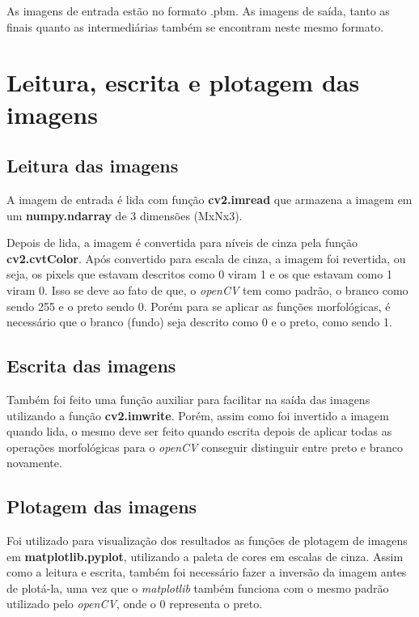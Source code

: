\documentclass{article}
\begin{document}
As imagens de entrada estão no formato .pbm. As imagens de saída, tanto as finais quanto as intermediárias também se encontram neste mesmo formato.

\section{Leitura, escrita e plotagem das imagens}

\subsection{Leitura das imagens}

A imagem de entrada é lida com função \textbf{cv2.imread} que armazena a imagem em um \textbf{numpy.ndarray} de 3 dimensões (MxNx3).

Depois de lida, a imagem é convertida para níveis de cinza pela função \textbf{cv2.cvtColor}. Após convertido para escala de cinza, a imagem foi revertida, ou seja, os pixels que estavam descritos como 0 viram 1 e os que estavam como 1 viram 0. Isso se deve ao fato de que, o \textit{openCV} tem como padrão, o branco como sendo 255 e o preto sendo 0. Porém para se aplicar as funções morfológicas, é necessário que o branco (fundo) seja descrito como 0 e o preto, como sendo 1.

\subsection{Escrita das imagens}

Também foi feito uma função auxiliar para facilitar na saída das imagens utilizando a função \textbf{cv2.imwrite}. Porém, assim como foi invertido a imagem quando lida, o mesmo deve ser feito quando escrita depois de aplicar todas as operações morfológicas para o \textit{openCV} conseguir distinguir entre preto e branco novamente.

\subsection{Plotagem das imagens}

Foi utilizado para visualização dos resultados as funções de plotagem de imagens em \textbf{matplotlib.pyplot}, utilizando a paleta de cores em escalas de cinza. Assim como a leitura e escrita, também foi necessário fazer a inversão da imagem antes de plotá-la, uma vez que o \textit{matplotlib} também funciona com o mesmo padrão utilizado pelo \textit{openCV}, onde o 0 representa o preto.
\end{document}
